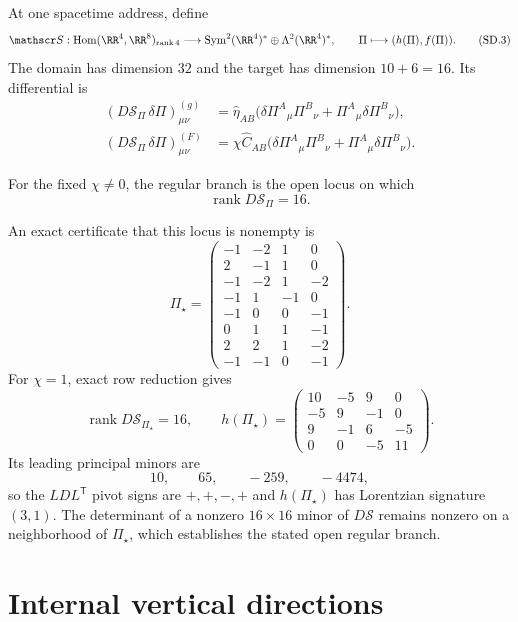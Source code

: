 \documentclass[10pt]{article}
\newcommand{\hateta}{\widehat\eta}
\newcommand{\hatC}{\widehat C}
\newcommand{\rankop}{\operatorname{rank}}
\begin{document}
At one spacetime address, define
\[
\mathscr S:\operatorname{Hom}(\RR^4,\RR^8)_{\mathrm{rank}\,4}
\longrightarrow \operatorname{Sym}^2(\RR^4)^*\oplus\Lambda^2(\RR^4)^*,
\qquad
\Pi\longmapsto(h(\Pi),f(\Pi)).
\tag{SD.3}
\]
The domain has dimension $32$ and the target has dimension $10+6=16$. Its
differential is
\[
\begin{aligned}
(D\mathscr S_\Pi\,\delta\Pi)^{(g)}_{\mu\nu}
&=\hateta_{AB}\bigl(\delta\Pi^A{}_{\mu}\Pi^B{}_{\nu}
+\Pi^A{}_{\mu}\delta\Pi^B{}_{\nu}\bigr),\\
(D\mathscr S_\Pi\,\delta\Pi)^{(F)}_{\mu\nu}
&=\chi\hatC_{AB}\bigl(\delta\Pi^A{}_{\mu}\Pi^B{}_{\nu}
+\Pi^A{}_{\mu}\delta\Pi^B{}_{\nu}\bigr).
\end{aligned}
\tag{SD.4}
\]

\begin{definition}
For the fixed $\chi\ne0$, the regular branch is the open locus on which
\[
\rankop D\mathscr S_\Pi=16.
\tag{SD.5}
\]
\end{definition}

An exact certificate that this locus is nonempty is
\[
\Pi_\star=
\begin{pmatrix}
-1&-2& 1& 0\\
 2&-1& 1& 0\\
-1&-2& 1&-2\\
-1& 1&-1& 0\\
-1& 0& 0&-1\\
 0& 1& 1&-1\\
 2& 2& 1&-2\\
-1&-1& 0&-1
\end{pmatrix}.
\tag{SD.6}
\]
For $\chi=1$, exact row reduction gives
\[
\rankop D\mathscr S_{\Pi_\star}=16,
\qquad
h(\Pi_\star)=
\begin{pmatrix}
10&-5& 9& 0\\
-5& 9&-1& 0\\
 9&-1& 6&-5\\
 0& 0&-5&11
\end{pmatrix}.
\tag{SD.7}
\]
Its leading principal minors are
\[
10,\qquad65,\qquad-259,\qquad-4474,
\tag{SD.8}
\]
so the $LDL^{\mathsf T}$ pivot signs are $+,+,-,+$ and
$h(\Pi_\star)$ has Lorentzian signature $(3,1)$. The determinant of a
nonzero $16\times16$ minor of $D\mathscr S$ remains nonzero on a
neighborhood of $\Pi_\star$, which establishes the stated open regular
branch.

\section{Internal vertical directions}
\end{document}
